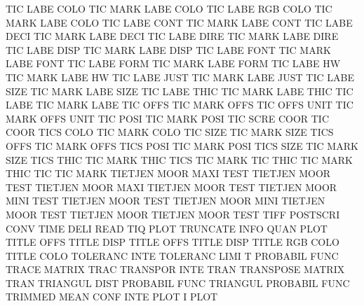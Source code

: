 TIC      LABE COLO                      TIC      MARK LABE COLO
TIC      LABE RGB  COLO                 TIC      MARK LABE COLO
TIC      LABE CONT                      TIC      MARK LABE CONT
TIC      LABE DECI                      TIC      MARK LABE DECI
TIC      LABE DIRE                      TIC      MARK LABE DIRE
TIC      LABE DISP                      TIC      MARK LABE DISP
TIC      LABE FONT                      TIC      MARK LABE FONT
TIC      LABE FORM                      TIC      MARK LABE FORM
TIC      LABE HW                        TIC      MARK LABE HW
TIC      LABE JUST                      TIC      MARK LABE JUST
TIC      LABE SIZE                      TIC      MARK LABE SIZE
TIC      LABE THIC                      TIC      MARK LABE THIC
TIC      LABE                           TIC      MARK LABE
TIC      OFFS                           TIC      MARK OFFS
TIC      OFFS UNIT                      TIC      MARK OFFS UNIT
TIC      POSI                           TIC      MARK POSI
TIC      SCRE COOR                      TIC      COOR
TICS     COLO                           TIC      MARK COLO
TIC      SIZE                           TIC      MARK SIZE
TICS     OFFS                           TIC      MARK OFFS
TICS     POSI                           TIC      MARK POSI
TICS     SIZE                           TIC      MARK SIZE
TICS     THIC                           TIC      MARK THIC
TICS                                    TIC      MARK
TIC      THIC                           TIC      MARK THIC
TIC                                     TIC      MARK
TIETJEN  MOOR MAXI TEST                 TIETJEN  MOOR TEST
TIETJEN  MOOR MAXI                      TIETJEN  MOOR TEST
TIETJEN  MOOR MINI TEST                 TIETJEN  MOOR TEST
TIETJEN  MOOR MINI                      TIETJEN  MOOR TEST
TIETJEN  MOOR                           TIETJEN  MOOR TEST
TIFF                                    POSTSCRI CONV
TIME     DELI                           READ
TIQ      PLOT                           TRUNCATE INFO QUAN PLOT
TITLE    OFFS                           TITLE    DISP
TITLE    OFFS                           TITLE    DISP
TITLE    RGB  COLO                      TITLE    COLO
TOLERANC INTE                           TOLERANC LIMI
T                                       PROBABIL FUNC
TRACE                                   MATRIX   TRAC
TRANSPOR INTE                           TRAN
TRANSPOSE                               MATRIX   TRAN
TRIANGUL DIST                           PROBABIL FUNC
TRIANGUL                                PROBABIL FUNC
TRIMMED  MEAN CONF INTE PLOT            I        PLOT
